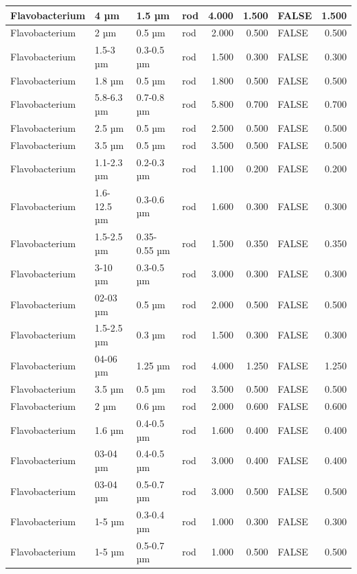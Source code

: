 \documentclass[
]{article}
\begin{document}
\begin{table}
\begin{tabular}{l|l|l|l|r|r|l|r}
\hline
Flavobacterium & 4 µm & 1.5 µm & rod & 4.000 & 1.500 & FALSE & 1.500\\
\hline
Flavobacterium & 2 µm & 0.5 µm & rod & 2.000 & 0.500 & FALSE & 0.500\\
\hline
Flavobacterium & 1.5-3 µm & 0.3-0.5 µm & rod & 1.500 & 0.300 & FALSE & 0.300\\
\hline
Flavobacterium & 1.8 µm & 0.5 µm & rod & 1.800 & 0.500 & FALSE & 0.500\\
\hline
Flavobacterium & 5.8-6.3 µm & 0.7-0.8 µm & rod & 5.800 & 0.700 & FALSE & 0.700\\
\hline
Flavobacterium & 2.5 µm & 0.5 µm & rod & 2.500 & 0.500 & FALSE & 0.500\\
\hline
Flavobacterium & 3.5 µm & 0.5 µm & rod & 3.500 & 0.500 & FALSE & 0.500\\
\hline
Flavobacterium & 1.1-2.3 µm & 0.2-0.3 µm & rod & 1.100 & 0.200 & FALSE & 0.200\\
\hline
Flavobacterium & 1.6-12.5 µm & 0.3-0.6 µm & rod & 1.600 & 0.300 & FALSE & 0.300\\
\hline
Flavobacterium & 1.5-2.5 µm & 0.35-0.55 µm & rod & 1.500 & 0.350 & FALSE & 0.350\\
\hline
Flavobacterium & 3-10 µm & 0.3-0.5 µm & rod & 3.000 & 0.300 & FALSE & 0.300\\
\hline
Flavobacterium & 02-03 µm & 0.5 µm & rod & 2.000 & 0.500 & FALSE & 0.500\\
\hline
Flavobacterium & 1.5-2.5 µm & 0.3 µm & rod & 1.500 & 0.300 & FALSE & 0.300\\
\hline
Flavobacterium & 04-06 µm & 1.25 µm & rod & 4.000 & 1.250 & FALSE & 1.250\\
\hline
Flavobacterium & 3.5 µm & 0.5 µm & rod & 3.500 & 0.500 & FALSE & 0.500\\
\hline
Flavobacterium & 2 µm & 0.6 µm & rod & 2.000 & 0.600 & FALSE & 0.600\\
\hline
Flavobacterium & 1.6 µm & 0.4-0.5 µm & rod & 1.600 & 0.400 & FALSE & 0.400\\
\hline
Flavobacterium & 03-04 µm & 0.4-0.5 µm & rod & 3.000 & 0.400 & FALSE & 0.400\\
\hline
Flavobacterium & 03-04 µm & 0.5-0.7 µm & rod & 3.000 & 0.500 & FALSE & 0.500\\
\hline
Flavobacterium & 1-5 µm & 0.3-0.4 µm & rod & 1.000 & 0.300 & FALSE & 0.300\\
\hline
Flavobacterium & 1-5 µm & 0.5-0.7 µm & rod & 1.000 & 0.500 & FALSE & 0.500\\
\hline

\end{tabular}
\end{table}
\end{document}
